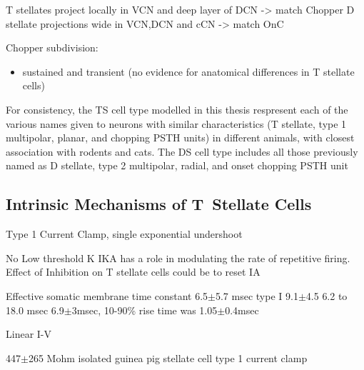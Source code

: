 T stellates project locally in VCN and deep layer of DCN -> match Chopper \citep{RhodeOertelEtAl:1983,SmithRhode:1989}
D stellate projections wide in VCN,DCN and cCN -> match OnC  \citep{SmithRhode:1989}



Chopper subdivision:
\begin{itemize}
\item sustained and transient (no evidence for anatomical differences in T stellate cells)
\end{itemize}




  For consistency, the TS cell type modelled in this thesis respresent each of the
  various names given to neurons with similar characteristics (T stellate, type 1
  multipolar, planar, and chopping PSTH units) in different animals, with closest
  association with rodents and cats. The DS cell type includes all those previously named as D stellate, type 2
  multipolar, radial, and onset chopping PSTH unit



 \subsection{Intrinsic Mechanisms of T~Stellate Cells}\label{sec:intr-mech-tstellate} %


Type 1 Current Clamp, single exponential undershoot
      \citep{FengKuwadaEtAl:1994,ManisMarx:1991,WuOertel:1984}         
\citep{FujinoOertel:2001,FerragamoGoldingEtAl:1998a} 



\citep{RothmanManis:2003,RothmanManis:2003a,RothmanManis:2003b,Rothman:1999}


No Low threshold
K \citep{ManisMarx:1991} 
IKA has a role in modulating the rate of repetitive
firing.  
Effect of Inhibition on T stellate cells could be to reset IA \citep{RothmanManis:2003c}                       

Effective somatic membrane time constant 6.5{$\pm$}5.7 msec \citep{ManisMarx:1991}
type I 9.1{$\pm$}4.5 \citep{ManisMarx:1991} 
6.2 to 18.0 msec
\citep{FengKuwadaEtAl:1994} 6.9{$\pm$}3msec, 10-90\% rise time was
         1.05{$\pm$}0.4msec \citep{IsaacsonWalmsley:1995}           

Linear I-V                       \citep{ManisMarx:1991}                     

447{$\pm$}265 Mohm isolated guinea pig stellate cell type 1 current clamp
\citep{ManisMarx:1991} 

